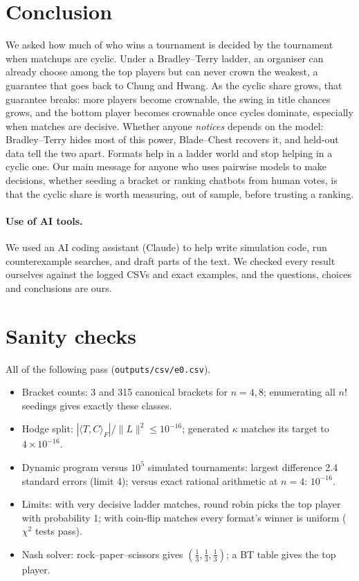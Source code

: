\documentclass[11pt]{article}
\theoremstyle{remark}
\newcommand{\kap}{\kappa}
\begin{document}
\section{Conclusion}
\label{sec:conclusion}
We asked how much of who wins a tournament is decided by the tournament when matchups are cyclic. Under a Bradley--Terry ladder,
an organiser can already choose among the top players but can never crown the weakest, a guarantee that goes back to Chung and
Hwang. As the cyclic share grows, that guarantee breaks: more players become crownable, the swing in title chances grows, and
the bottom player becomes crownable once cycles dominate, especially when matches are decisive. Whether anyone \emph{notices}
depends on the model: Bradley--Terry hides most of this power, Blade--Chest recovers it, and held-out data tell the two apart. Formats
help in a ladder world and stop helping in a cyclic one. Our main message for anyone who uses pairwise models to make decisions,
whether seeding a bracket or ranking chatbots from human votes, is that the cyclic share is worth measuring, out of sample,
before trusting a ranking.

\paragraph{Use of AI tools.} We used an AI coding assistant (Claude) to help write simulation code, run counterexample searches,
and draft parts of the text. We checked every result ourselves against the logged CSVs and exact examples, and the questions,
choices and conclusions are ours.




\appendix
\section{Sanity checks}
\label{app:sanity}
All of the following pass (\texttt{outputs/csv/e0.csv}).
\begin{itemize}
\item Bracket counts: 3 and 315 canonical brackets for $n=4,8$; enumerating all $n!$ seedings gives exactly these classes.
\item Hodge split: $|\langle T,C\rangle_F|/\|L\|^2\le10^{-16}$; generated $\kap$ matches its target to $4\times10^{-16}$.
\item Dynamic program versus $10^5$ simulated tournaments: largest difference 2.4 standard errors (limit 4); versus exact
rational arithmetic at $n=4$: $10^{-16}$.
\item Limits: with very decisive ladder matches, round robin picks the top player with probability 1; with coin-flip matches
every format's winner is uniform ($\chi^2$ tests pass).
\item Nash solver: rock--paper--scissors gives $(\frac13,\frac13,\frac13)$; a BT table gives the top player.
\end{itemize}
\end{document}
